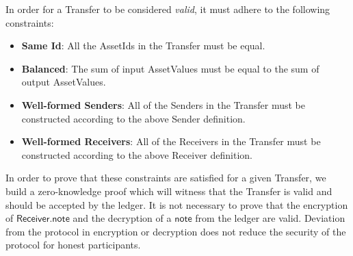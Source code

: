 \documentclass[a4paper]{article}
\theoremstyle{definition}
\newcommand{\AssetId}{{\textsf{AssetId}}}
\newcommand{\AssetValue}{{\textsf{AssetValue}}}
\newcommand{\Receiver}{{\textsf{Receiver}}}
\newcommand{\Sender}{{\textsf{Sender}}}
\newcommand{\Transfer}{{\textsf{Transfer}}}
\newcommand{\note}{{\textsf{note}}}
\begin{document}
In order for a \Transfer{} to be considered \emph{valid}, it must adhere to the following constraints:

\begin{itemize}
    \item \textbf{Same Id}: All the \AssetId{s} in the \Transfer{} must be equal.
    \item \textbf{Balanced}: The sum of input \AssetValue{s} must be equal to the sum of output \AssetValue{s}.
    \item \textbf{Well-formed Senders}: All of the \Sender{s} in the \Transfer{} must be constructed according to the above \Sender{} definition.
    \item \textbf{Well-formed Receivers}: All of the \Receiver{s} in the \Transfer{} must be constructed according to the above \Receiver{} definition.
\end{itemize}

In order to prove that these constraints are satisfied for a given \Transfer{}, we build a zero-knowledge proof which will witness that the \Transfer{} is valid and should be accepted by the ledger. It is not necessary to prove that the encryption of $\Receiver.\note$ and the decryption of a $\note$ from the ledger are valid. Deviation from the protocol in encryption or decryption does not reduce the security of the protocol for honest participants.
\end{document}
